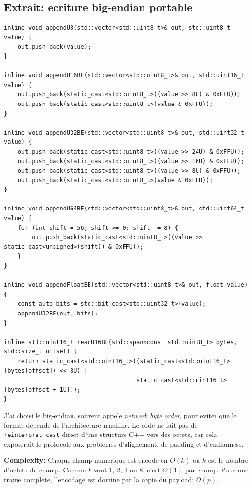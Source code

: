 \documentclass[10pt,a4paper]{article}
\newcommand{\complexity}[1]{\textbf{Complexity:} #1}
\begin{document}
\subsection{Extrait: ecriture big-endian portable}
\begin{lstlisting}[caption={Serialisation big-endian explicite}]
inline void appendU8(std::vector<std::uint8_t>& out, std::uint8_t value) {
    out.push_back(value);
}

inline void appendU16BE(std::vector<std::uint8_t>& out, std::uint16_t value) {
    out.push_back(static_cast<std::uint8_t>((value >> 8U) & 0xFFU));
    out.push_back(static_cast<std::uint8_t>(value & 0xFFU));
}

inline void appendU32BE(std::vector<std::uint8_t>& out, std::uint32_t value) {
    out.push_back(static_cast<std::uint8_t>((value >> 24U) & 0xFFU));
    out.push_back(static_cast<std::uint8_t>((value >> 16U) & 0xFFU));
    out.push_back(static_cast<std::uint8_t>((value >> 8U) & 0xFFU));
    out.push_back(static_cast<std::uint8_t>(value & 0xFFU));
}

inline void appendU64BE(std::vector<std::uint8_t>& out, std::uint64_t value) {
    for (int shift = 56; shift >= 0; shift -= 8) {
        out.push_back(static_cast<std::uint8_t>((value >> static_cast<unsigned>(shift)) & 0xFFU));
    }
}

inline void appendFloatBE(std::vector<std::uint8_t>& out, float value) {
    const auto bits = std::bit_cast<std::uint32_t>(value);
    appendU32BE(out, bits);
}

inline std::uint16_t readU16BE(std::span<const std::uint8_t> bytes, std::size_t offset) {
    return static_cast<std::uint16_t>((static_cast<std::uint16_t>(bytes[offset]) << 8U) |
                                      static_cast<std::uint16_t>(bytes[offset + 1U]));
}

\end{lstlisting}


J'ai choisi le big-endian, souvent appele \textit{network byte order}, pour eviter que le format depende de l'architecture machine. Le code ne fait pas de \texttt{reinterpret\_cast} direct d'une structure C++ vers des octets, car cela exposerait le protocole aux problemes d'alignement, de padding et d'endianness.

\complexity{Chaque champ numerique est encode en $O(k)$ ou $k$ est le nombre d'octets du champ. Comme $k$ vaut 1, 2, 4 ou 8, c'est $O(1)$ par champ. Pour une trame complete, l'encodage est domine par la copie du payload: $O(p)$.}
\end{document}
